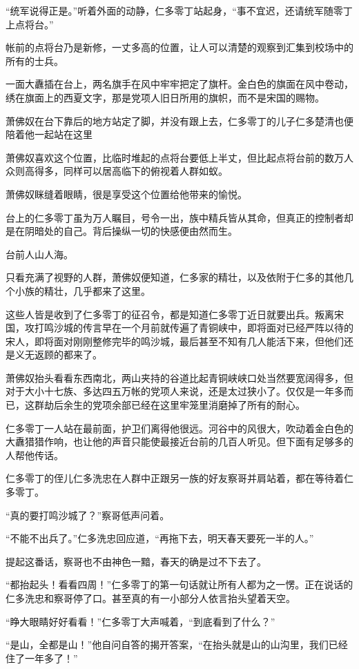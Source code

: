 “统军说得正是。”听着外面的动静，仁多零丁站起身，“事不宜迟，还请统军随零丁上点将台。”

帐前的点将台乃是新修，一丈多高的位置，让人可以清楚的观察到汇集到校场中的所有的士兵。

一面大纛插在台上，两名旗手在风中牢牢把定了旗杆。金白色的旗面在风中卷动，绣在旗面上的西夏文字，那是党项人旧日所用的旗帜，而不是宋国的赐物。

萧佛奴在台下靠后的地方站定了脚，并没有跟上去，仁多零丁的儿子仁多楚清也便陪着他一起站在这里

萧佛奴喜欢这个位置，比临时堆起的点将台要低上半丈，但比起点将台前的数万人众则高得多，同样可以居高临下的俯视着人群如蚁。

萧佛奴眯缝着眼睛，很是享受这个位置给他带来的愉悦。

台上的仁多零丁虽为万人瞩目，号令一出，族中精兵皆从其命，但真正的控制者却是在阴暗处的自己。背后操纵一切的快感便由然而生。

台前人山人海。

只看充满了视野的人群，萧佛奴便知道，仁多家的精壮，以及依附于仁多的其他几个小族的精壮，几乎都来了这里。

这些人皆是收到了仁多零丁的征召令，都是知道仁多零丁近日就要出兵。叛离宋国，攻打鸣沙城的传言早在一个月前就传遍了青铜峡中，即将面对已经严阵以待的宋人，即将面对刚刚整修完毕的鸣沙城，最后甚至不知有几人能活下来，但他们还是义无返顾的都来了。

萧佛奴抬头看看东西南北，两山夹持的谷道比起青铜峡峡口处当然要宽阔得多，但对于大小十七族、多达四五万帐的党项人来说，还是太过狭小了。仅仅是一年多而已，这群劫后余生的党项余部已经在这里牢笼里消磨掉了所有的耐心。

仁多零丁一人站在最前面，护卫们离得他很远。河谷中的风很大，吹动着金白色的大纛猎猎作响，也让他的声音只能使最接近台前的几百人听见。但下面有足够多的人帮他传话。

仁多零丁的侄儿仁多洗忠在人群中正跟另一族的好友察哥并肩站着，都在等待着仁多零丁。

“真的要打鸣沙城了？”察哥低声问着。

“不能不出兵了。”仁多洗忠回应道，“再拖下去，明天春天要死一半的人。”

提起这番话，察哥也不由神色一黯，春天的确是过不下去了。

“都抬起头！看看四周！”仁多零丁的第一句话就让所有人都为之一愣。正在说话的仁多洗忠和察哥停了口。甚至真的有一小部分人依言抬头望着天空。

“睁大眼睛好好看看！”仁多零丁大声喊着，“到底看到了什么？”

“是山，全都是山！”他自问自答的揭开答案，“在抬头就是山的山沟里，我们已经住了一年多了！”

